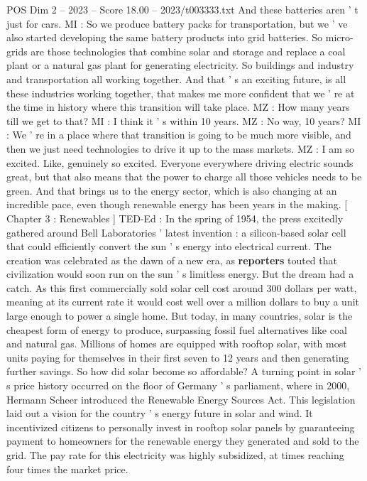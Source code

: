 \begin{textsample}{POS Dim 2 – 2023 – Score 18.00 – 2023/t003333.txt}
And these batteries aren ' t just for cars.
MI : So we produce battery packs for transportation, but we ' ve also started developing the same battery products into grid batteries.
So micro-grids are those technologies that combine solar and storage and replace a coal plant or a natural gas plant for generating electricity.
So buildings and industry and transportation all working together.
And that ' s an exciting future, is all these industries working together, that makes me more confident that we ' re at the time in history where this transition will take place.
MZ : How many years till we get to that?
MI : I think it ' s within 10 years.
MZ : No way, 10 years?
MI : We ' re in a place where that transition is going to be much more visible, and then we just need technologies to drive it up to the mass markets.
MZ : I am so excited.
Like, genuinely so excited.
Everyone everywhere driving electric sounds great, but that also means that the power to charge all those vehicles needs to be green.
And that brings us to the energy sector, which is also changing at an incredible pace, even though renewable energy has been years in the making. [ Chapter 3 : Renewables ] TED-Ed : In the spring of 1954, the press excitedly gathered around Bell Laboratories ' latest invention : a silicon-based solar cell that could efficiently convert the sun ' s energy into electrical current.
The creation was celebrated as the dawn of a new era, as \textbf{reporters} touted that civilization would soon run on the sun ' s limitless energy.
But the dream had a catch.
As this first commercially sold solar cell cost around 300 dollars per watt, meaning at its current rate it would cost well over a million dollars to buy a unit large enough to power a single home.
But today, in many countries, solar is the cheapest form of energy to produce, surpassing fossil fuel alternatives like coal and natural gas.
Millions of homes are equipped with rooftop solar, with most units paying for themselves in their first seven to 12 years and then generating further savings.
So how did solar become so affordable?
A turning point in solar ' s price history occurred on the floor of Germany ' s parliament, where in 2000, Hermann Scheer introduced the Renewable Energy Sources Act.
This legislation laid out a vision for the country ' s energy future in solar and wind.
It incentivized citizens to personally invest in rooftop solar panels by guaranteeing payment to homeowners for the renewable energy they generated and sold to the grid.
The pay rate for this electricity was highly subsidized, at times reaching four times the market price.

\end{textsample}
